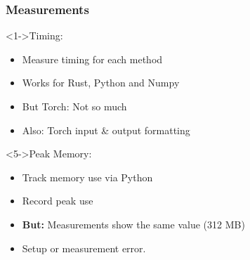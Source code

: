 \documentclass[t,english]{beamer}
\begin{document}
\begin{frame}
    \frametitle{Measurements}
    \begin{block}<1->{Timing:}
        \begin{itemize}
        \item<1-> Measure timing for each method
        \item<2-> Works for Rust, Python and Numpy
        \item <3-> But Torch: Not so much
        \item <4-> Also: Torch input \& output formatting
        \end{itemize}
    \end{block}

    \begin{block}<5->{Peak Memory:}
        \begin{itemize}
        \item<5-> Track memory use via Python
        \item <6-> Record peak use
        \item <7-> \textbf{But:} Measurements show the same value (312 MB)
        \item <8-> Setup or measurement error.
        \end{itemize}
    \end{block}
\end{frame}
\end{document}
